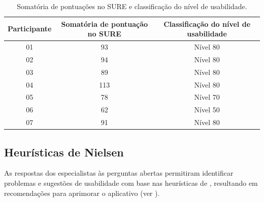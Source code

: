 \documentclass[portuguese]{textolivre}
\begin{document}
\begin{table}[h!]
\begin{threeparttable}
\caption{Somatória de pontuações no SURE e classificação do nível de usabilidade.}
\label{tab3}
\begin{tabular}{ccc}
\toprule
Participante &
Somatória de pontuação no SURE &
Classificação do nível de usabilidade \\
\midrule

01 & 93  & Nível 80 \\
02 & 94  & Nível 80 \\
03 & 89  & Nível 80 \\
04 & 113 & Nível 80 \\
05 & 78  & Nível 70 \\
06 & 62  & Nível 50 \\
07 & 91  & Nível 80 \\

\bottomrule
\end{tabular}
\end{threeparttable}
\end{table}

\subsection{Heurísticas de Nielsen}\label{sec-titulo}
As respostas dos especialistas às perguntas abertas permitiram identificar problemas e sugestões de usabilidade com base nas heurísticas de \textcite{nielsen1995heuristics}, resultando em recomendações para aprimorar o aplicativo (ver ).
\end{document}
